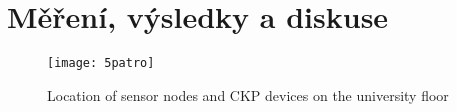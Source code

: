 \chapter{Měření, výsledky a diskuse}


\begin{figure*}[!ht]
    \centering
    \texttt{[image: 5patro]}
    \caption{Location of sensor nodes and CKP devices on the university floor}
    \label{fig:CorridorFloorPlan}
\end{figure*}




